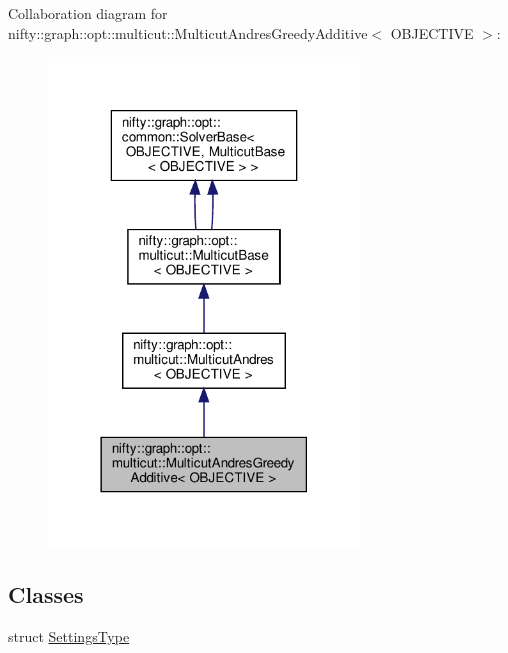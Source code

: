 Collaboration diagram for nifty\+:\+:graph\+:\+:opt\+:\+:multicut\+:\+:Multicut\+Andres\+Greedy\+Additive$<$ O\+B\+J\+E\+C\+T\+I\+VE $>$\+:
\nopagebreak
\begin{figure}[H]
\begin{center}
\leavevmode
\includegraphics[width=234pt]{classnifty_1_1graph_1_1opt_1_1multicut_1_1MulticutAndresGreedyAdditive__coll__graph}
\end{center}
\end{figure}
\subsection*{Classes}
\begin{DoxyCompactItemize}
\item 
struct \hyperlink{structnifty_1_1graph_1_1opt_1_1multicut_1_1MulticutAndresGreedyAdditive_1_1SettingsType}{Settings\+Type}
\end{DoxyCompactItemize}
